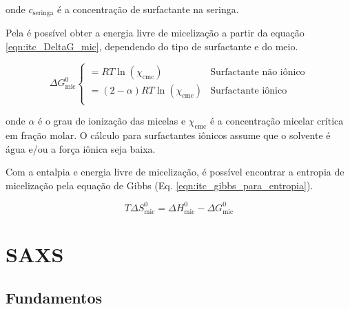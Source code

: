 		\noindent onde \(c_{\mathrm{seringa}}\) é a concentração de surfactante na seringa.
		
		Pela \cmc{} é possível obter a energia livre de micelização a partir da equação \ref{eqn:itc_DeltaG_mic}, dependendo do tipo de surfactante e do meio.
		
		\begin{equation}
			\Delta G_{\textrm{mic}}^0
			\begin{cases}
			= RT\ln(\chi_{\textrm{cmc}})      & \textrm{Surfactante não iônico}      \\
			= (2-\alpha)RT\ln(\chi_{\textrm{cmc}}) & \textrm{Surfactante iônico}					\\
			\end{cases}
			\label{eqn:itc_DeltaG_mic}
		\end{equation}
		
		\noindent onde \(\alpha\) é o grau de ionização das micelas e \(\chi_{\mathrm{cmc}}\) é a concentração micelar crítica em fração molar. O cálculo para surfactantes iônicos assume que o solvente é água e/ou a força iônica seja baixa.
		
		Com a entalpia e energia livre de micelização, é possível encontrar a entropia de micelização pela equação de Gibbs (Eq. \ref{eqn:itc_gibbs_para_entropia}).
		
		\begin{equation}
			T\Delta S^0_{\textrm{mic}} = \Delta H^0_{\textrm{mic}} - \Delta G^0_{\textrm{mic}}
			\label{eqn:itc_gibbs_para_entropia}
		\end{equation}


	\chapter{SAXS}
		\section{Fundamentos}
				
		
